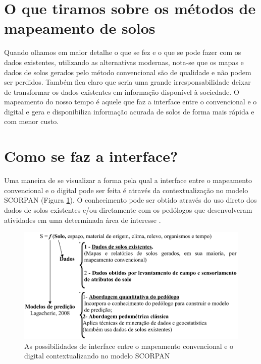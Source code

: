 \section{O que tiramos sobre os métodos de mapeamento de solos}
Quando olhamos em maior detalhe o que se fez e o que se pode fazer com os dados existentes, utilizando as alternativas modernas, nota-se que os mapas e dados de solos gerados pelo método convencional são de qualidade e não podem ser perdidos. Também fica claro que seria uma grande irresponsabilidade deixar de transformar os dados existentes em informação disponível à sociedade. O mapeamento do nosso tempo é aquele que faz a interface entre o convencional e o digital e gera e disponibiliza informação acurada de solos de forma mais rápida e com menor custo.
\section{Como se faz a interface?}
Uma maneira de se visualizar a forma pela qual a interface entre o mapeamento convencional e o digital pode ser feita é através da contextualização no modelo SCORPAN (Figura \ref{fig:esquema}). O conhecimento pode ser obtido através do uso direto dos dados de solos existentes e/ou diretamente com os pedólogos que desenvolveram atividades em uma determinada área de interesse \citep{Lagacherie:2008}.\\
\begin{figure}[tb!]
\begin{minipage}[t]{1\linewidth}
\begin{center}
   \includegraphics[width=\textwidth]{figuras/marcos-esquema}
   \caption{As possibilidades de interface entre o mapeamento convencional e o digital contextualizando no modelo SCORPAN}
   \label{fig:esquema}
 \end{center}
\end{minipage}
\end{figure}
